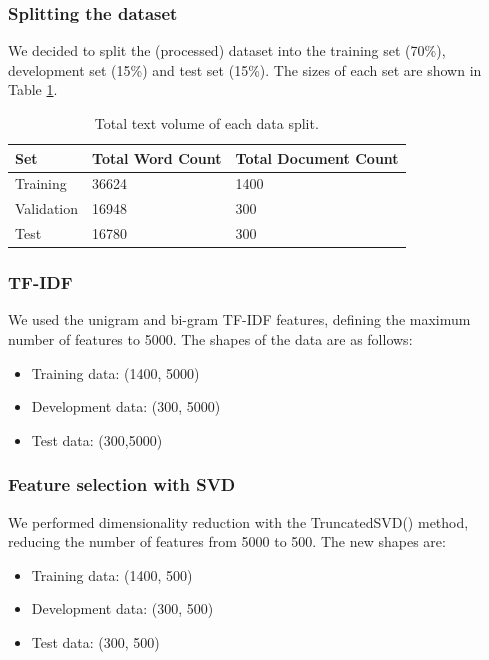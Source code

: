 \documentclass[10pt, a4paper]{article}
\begin{document}
    \subsubsection{Splitting the dataset}
    We decided to split the (processed) dataset into the training set (70\%), development set (15\%) and test set (15\%). The sizes of each set are shown in Table \ref{tab::ex-9-stats}.

    \begin{table}
		\begin{tabular}{|l|l|l|}
			\hline
			\cellcolor{blue!25}\textbf{Set} & \cellcolor{blue!25}\textbf{Total Word Count} &
			\cellcolor{blue!25}\textbf{Total Document Count}\\
			\hline
			Training & 36624 & 1400 \\\hline
			Validation & 16948  & 300 \\\hline
			Test & 16780 & 300 \\\hline
		\end{tabular}
		\centering
		\caption{Total text volume of each data split.}
		\label{tab::ex-9-stats}
	\end{table}
    

    \subsubsection{TF-IDF}
    We used the unigram and bi-gram TF-IDF features, defining the maximum number of features to 5000. The shapes of the data are as follows:

    
    \begin{itemize}
        \item Training data: (1400, 5000)
        \item Development data: (300, 5000)
        \item Test data: (300,5000)
    \end{itemize}

    \subsubsection{Feature selection with SVD}
    We performed dimensionality reduction with the TruncatedSVD() method, reducing the number of features from 5000 to 500. The new shapes are:

    
    \begin{itemize}
        \item Training data: (1400, 500)
        \item Development data: (300, 500)
        \item Test data: (300, 500)
    \end{itemize}
\end{document}
